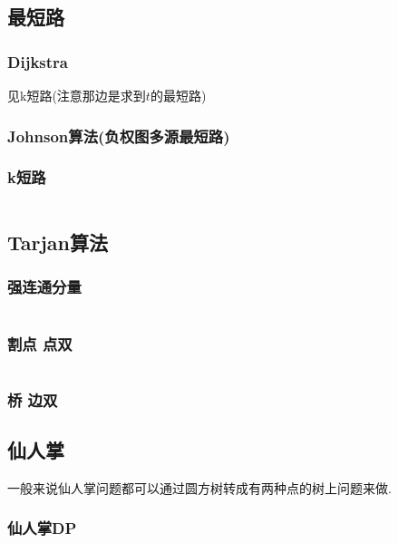 \documentclass[a4paper]{article}
\begin{document}
\begin{multicols}{2}
			
			\subsection{最短路}
				\subsubsection{Dijkstra}
					见k短路(注意那边是求到$t$的最短路)
				
				\subsubsection{Johnson算法(负权图多源最短路)}
					
				


				\subsubsection{k短路}
					\inputminted{cpp}{../src/graph/k短路.cpp}
			
			\subsection{Tarjan算法}
				\subsubsection{强连通分量}
					\inputminted{cpp}{../src/graph/强连通分量.cpp}
				
				\subsubsection{割点 点双}
					\inputminted{cpp}{../src/graph/割点点双.cpp}

				\subsubsection{桥 边双}


			\subsection{仙人掌}
				一般来说仙人掌问题都可以通过圆方树转成有两种点的树上问题来做.
				\subsubsection{仙人掌DP}
					\inputminted{cpp}{../src/graph/仙人掌DP.cpp}
			

\end{multicols}
\end{document}
